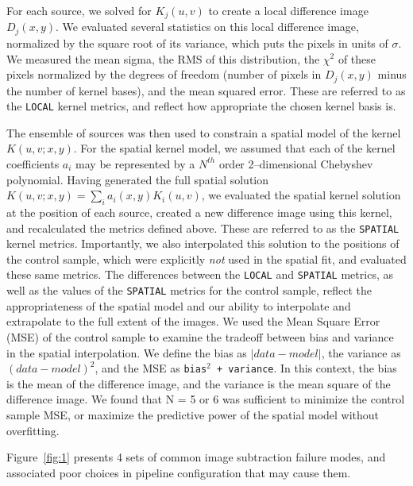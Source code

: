 \documentclass[floatfix, apj]{emulateapj}
\begin{document}
For each source, we solved for $K_j(u,v)$ to create a local difference image $D_j(x,y)$.
We evaluated several statistics on this local difference image, normalized by the square root of its variance, which puts the pixels in units of $\sigma$.
We measured the mean sigma, the RMS of this distribution, the $\chi^2$ of these pixels normalized by the degrees of freedom (number of pixels in $D_j(x,y)$ minus the number of kernel bases), and the mean squared error.
These are referred to as the {\tt LOCAL} kernel metrics, and reflect how appropriate the chosen kernel basis is.

The ensemble of sources was then used to constrain a spatial model of the kernel $K(u,v;x,y)$.
For the spatial kernel model, we assumed that each of the kernel coefficients $a_i$ may be represented by a $N^{th}$ order 2--dimensional Chebyshev polynomial.
Having generated the full spatial solution $K(u,v;x,y) = \sum_i a_i(x,y) K_i(u,v)$, we evaluated the spatial kernel solution at the position of each source, created a new difference image using this kernel, and recalculated the metrics defined above.
These are referred to as the {\tt SPATIAL} kernel metrics.
Importantly, we also interpolated this solution to the positions of the control sample, which were explicitly {\it not} used in the spatial fit, and evaluated these same metrics.
The differences between the {\tt LOCAL} and {\tt SPATIAL} metrics, as well as the values of the {\tt SPATIAL} metrics for the control sample, reflect the appropriateness of the spatial model and our ability to interpolate and extrapolate to the full extent of the images.
We used the Mean Square Error (MSE) of the control sample to examine the tradeoff between bias and variance in the spatial interpolation.
We define the bias as $\left| data - model \right|$, the variance as $(data - model)^2$, and the MSE as {\tt bias$^2$ + variance}.  
In this context, the bias is the mean of the difference image, and the variance is the mean square of the difference image.
We found that N = 5 or 6 was sufficient to minimize the control sample MSE, or maximize the predictive power of the spatial model without overfitting.

Figure~\ref{fig:1} presents 4 sets of common image subtraction failure modes, and associated poor choices in pipeline configuration that may cause them.
\end{document}
